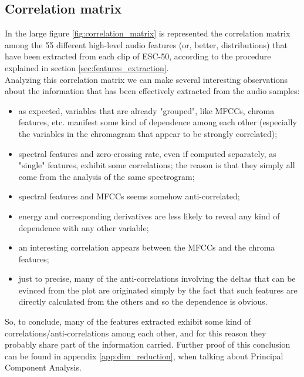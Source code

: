 
\subsection{Correlation matrix}
\label{app:correlation_matrix}
In the large figure \ref{fig:correlation_matrix} is represented the correlation matrix among the 55 different high-level audio features (or, better, distributions) that have been extracted from each clip of ESC-50, according to the procedure explained in section \ref{sec:features_extraction}.\\
Analyzing this correlation matrix we can make several interesting observations about the information that has been effectively extracted from the audio samples:
\begin{itemize}
	\itemsep0em
	\item as expected, variables that are already "grouped", like MFCCs, chroma features, etc. manifest some kind of dependence among each other (especially the variables in the chromagram that appear to be strongly correlated);
	\item spectral features and zero-crossing rate, even if computed separately, as "single" features, exhibit some correlations; the reason is that they simply all come from the analysis of the same spectrogram;
	\item spectral features and MFCCs seems somehow anti-correlated;
	\item energy and corresponding derivatives are less likely to reveal any kind of dependence with any other variable;
	\item an interesting correlation appears between the MFCCs and the chroma features;
	\item just to precise, many of the anti-correlations involving the deltas that can be evinced from the plot are originated simply by the fact that such features are directly calculated from the others and so the dependence is obvious.
\end{itemize}

So, to conclude, many of the features extracted exhibit some kind of correlations/anti-correlations among each other, and for this reason they probably share part of the information carried. Further proof of this conclusion can be found in appendix \ref{app:dim_reduction}, when talking about Principal Component Analysis.

